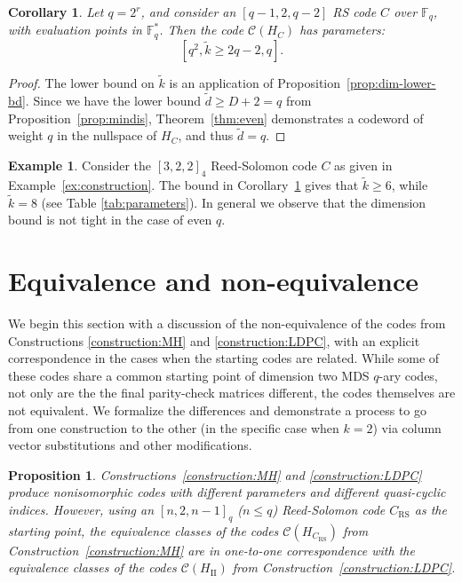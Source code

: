 \documentclass[11pt]{amsart}
\newtheorem{corollary}[theorem]{Corollary}
\newtheorem{proposition}[theorem]{Proposition}
\theoremstyle{definition}
\newtheorem{example}[theorem]{Example}
\newcommand{\0}{\mathbf{0}}
\newcommand{\C}{\mathcal{C}}
\newcommand{\F}{\mathbb{F}}
\begin{document}
\begin{corollary} \label{cor:even}
    Let $q=2^r$, and consider an $[q-1, 2, q-2]$ RS code $C$ over $\mathbb{F}_q$, with evaluation points in $\F_q^*$. Then the code $\C(H_C)$ has parameters: 
    \[ [q^2, \tilde{k}\geq 2q-2, q]. \]
\end{corollary}

\begin{proof}
    The lower bound on $\tilde{k}$ is an application of Proposition~\ref{prop:dim-lower-bd}. Since we have the lower bound $\tilde{d}\geq D+2=q$ from Proposition~\ref{prop:mindis}, Theorem~\ref{thm:even} demonstrates a codeword of weight $q$ in the nullspace of $H_C$, and thus $\tilde{d}=q$.
\end{proof}

\begin{example}
    Consider the $[3,2,2]_4$ Reed-Solomon code $C$ as given in Example~\ref{ex:construction}. The bound in Corollary~\ref{cor:even} gives that $\tilde{k} \geq 6$, while $\tilde{k}=8$ (see Table \ref{tab:parameters}). In general we observe that the dimension bound is not tight in the case of even $q$.
\end{example}

\section{Equivalence and non-equivalence} 
\label{sec:equivalence}

We begin this section with a discussion of the non-equivalence of the codes from Constructions \ref{construction:MH} and \ref{construction:LDPC}, with an explicit correspondence in the cases when the starting codes are related. While some of these codes share a common starting point of dimension two MDS $q$-ary codes, not only are the the final parity-check matrices  different, the codes themselves are not equivalent. We formalize the differences and demonstrate a process to go from one construction to the other (in the specific case when $k=2$) via column vector substitutions and other modifications.

\begin{proposition} 
Constructions~\ref{construction:MH} and \ref{construction:LDPC} produce nonisomorphic codes with different parameters and different quasi-cyclic indices. 
However, using an $[n, 2, n-1]_q$ ($n\leq q$)  Reed-Solomon code $C_{\text{RS}}$ as the starting point,  the equivalence classes of the codes $\C(H_{C_{\text{RS}}})$ from Construction~\ref{construction:MH}  are in one-to-one correspondence with the equivalence classes of the codes $\C(H_{\text{II}})$ from Construction~\ref{construction:LDPC}.   
\end{proposition}
\end{document}
